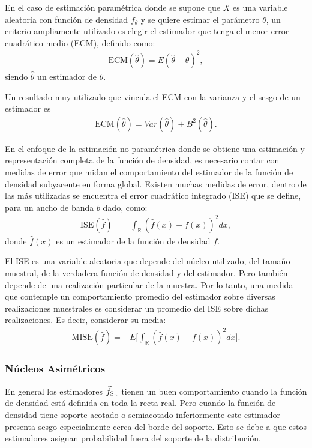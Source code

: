 En el caso de estimación paramétrica donde se supone que $X$ es una variable aleatoria con función de densidad $f_{\theta}$ y se quiere estimar el parámetro $\theta$, un criterio ampliamente utilizado es elegir el estimador que tenga el menor error cuadrático medio (ECM), definido como:
\begin{align}
\label{ErrorCuadraticoMedio}
\text{ECM}(\hat{\theta})=E(\widehat{\theta}-\theta)^2,
\end{align}
siendo $\widehat{\theta}$ un estimador de $\theta$. 

Un resultado muy utilizado que vincula el ECM con la varianza y el sesgo de un estimador es
\begin{align}
\text{ECM}(\hat{\theta})=Var(\hat{\theta})+B^2(\hat{\theta}).
\end{align}	

En el enfoque de la estimación no paramétrica donde se obtiene una estimación y representación completa de la función de densidad, es necesario contar con medidas de error que midan el comportamiento del estimador de la función de densidad subyacente en forma global. Existen muchas medidas de error, dentro de las más utilizadas se encuentra el error cuadrático integrado (ISE) que se define, para un ancho de banda $b$ dado, como:
\begin{align}
\text{ISE}(\widehat{f})=&\int_\mathbb{R} (\widehat{f}(x)-f(x))^2 dx ,
\end{align}
donde $\widehat{f}(x)$ es un estimador de la función de densidad $f$.

El ISE es una variable aleatoria que depende del núcleo utilizado, del tamaño muestral, de la verdadera función de densidad y del estimador. Pero también depende de una realización particular de la muestra. Por lo tanto, una medida que contemple un comportamiento promedio del estimador sobre diversas realizaciones muestrales es considerar un promedio del ISE sobre dichas realizaciones. Es decir, considerar su media:
\begin{align}
\label{MISE}
	\text{MISE}(\widehat{f})=&E\Big[\int_\mathbb{R} (\widehat{f}(x)-f(x))^2 dx \Big].
\end{align}

\subsubsection{Núcleos Asimétricos}
\label{NucleosAsimetricos}

En general los estimadores $\widehat{f}_{\tiny \text {S}_n}$ tienen un buen comportamiento cuando la función de densidad está definida en toda la recta real. Pero cuando la función de densidad tiene soporte acotado o semiacotado inferiormente este estimador presenta sesgo especialmente cerca del borde del soporte. Esto se debe a que estos estimadores asignan probabilidad fuera del soporte de la distribución.

